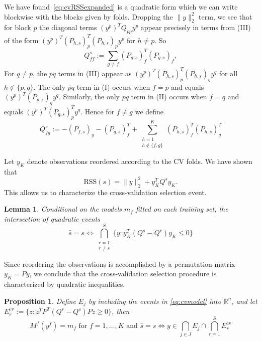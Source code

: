 \documentclass[preprint]{imsart}
\newtheorem{lem}{Lemma}[section]
\newtheorem{prop}{Proposition}[section]
\newcommand{\cv}{\text{cv}}
\begin{document}
We have found~\eqref{eq:cvRSSexpanded} is a quadratic form which we
can write blockwise with the blocks given by folds. Dropping the $\| y
\|_2^2$ term, we see that for block $p$ the diagonal terms $(y^p)^T
Q_{pp} y^p$ appear precisely in terms from (III) of the form $(y^p)^T
(P_{h,s})^T_p(P_{h,s})_p y^p$ for $h \neq p$. So 
\begin{equation}
  \label{eq:cvquaddiag}
  Q^s_{ff} := \sum_{g\neq f}(P_{g,s})_f^T(P_{g,s})_f, 
\end{equation}
For $q \neq p$, the $pq$ terms in (III) appear as
$(y^p)^T(P_{h,s})^T_p(P_{h,s})_q y^q$ for all $h \notin \{ p, q
\}$. The only $pq$ term in (I) occurs when $f = p$ and equals $(y^p)^T
(P_{p,s})_q y^q$. Similarly, the only $pq$ term in (II) occurs when $f
= q$ and equals $(y^p)^T (P_{q,s})^T_p y^q$. Hence for $f \neq g$ we
define 
\begin{equation}
  \label{eq:cvquadoffd}
  Q^s_{fg} := -(P_{f,s})_g - (P_{g,s})^T_f + \sum_{\substack{h=1\\h \notin \{f, g \}}}^K (P_{h,s})^T_f (P_{h,s})^T_g
\end{equation}

 Let $y_K$ denote observations reordered according to the CV folds. We
 have shown that 
 \begin{equation}
   \label{eq:RSSquad}
   \text{RSS}(s) = \|y\|_2^2 + y_K^T Q^s y_K.
 \end{equation}
This allows us to characterize the cross-validation selection event.
\begin{lem}
Conditional on the models $m_f$ fitted on each training set,
the intersection of quadratic events
\begin{equation}
  \label{eq:cvquad}
  \hat s = s \iff
  \bigcap_{\substack{r=1\\r\neq s}}^S \{ y : y_K^T(Q^s-Q^r)y_K \leq 0 \}
\end{equation}
\end{lem}
Since reordering the observations is accomplished by a permutation
matrix $y_K = Py$, we conclude that the cross-validation selection
procedure is characterized by quadratic inequalities. 
\begin{prop}
\label{prop:cv}
  Define $E_j$ by including the events in \eqref{eq:cvmodel} into
  $\mathbb R^n$, and let $E^\cv_r := \{ z : z^TP^T(Q^r-Q^s)Pz \geq 0
  \}$, then
  \begin{equation}
    \label{eq:mincvevent}
    M^f(y^f) = m_f \text{ for } f = 1, \ldots, K \text{ and } \hat s = s \iff
    y \in \bigcap_{j \in J} E_j \cap \bigcap_{r=1}^S E^\cv_r
  \end{equation}
\end{prop}
\end{document}
